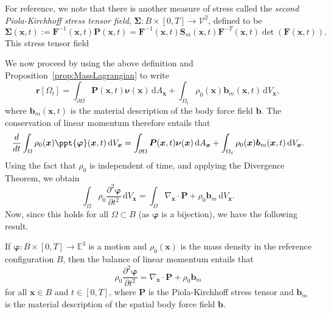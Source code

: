 \documentclass[
  letterpaper,
  DIV=11,
  numbers=noendperiod]{scrreprt}
\theoremstyle{plain}
\theoremstyle{remark}
\begin{document}
For reference, we note that there is another measure of stress called
the \emph{second Piola-Kirchhoff stress tensor field},
\({\boldsymbol{\Sigma}}:B\times[0,T]\to{\mathcal{V}}^2\), defined to be
\[{\boldsymbol{\Sigma}}({\boldsymbol{x}},t) := {\boldsymbol{F}}^{-1}({\boldsymbol{x}},t){\boldsymbol{P}}({\boldsymbol{x}},t) = {\boldsymbol{F}}^{-1}({\boldsymbol{x}},t){\boldsymbol{S}}_m({\boldsymbol{x}},t){\boldsymbol{F}}^{-T}({\boldsymbol{x}},t)\det({\boldsymbol{F}}({\boldsymbol{x}},t)).\]
This stress tensor field

We now proceed by using the above definition and
Proposition~\hyperref[prop:MassLagrangian]{{[}prop:MassLagrangian{]}} to
write \[{\boldsymbol{r}}[\Omega_t]
  = \int_{\partial \Omega} {\boldsymbol{P}}({\boldsymbol{x}},t){\boldsymbol{\nu}}({\boldsymbol{x}}){\,{\mathrm{d}}A_{{\boldsymbol{x}}}}+\int_{\Omega_t}\rho_0({\boldsymbol{x}}){\boldsymbol{b}}_m({\boldsymbol{x}},t){\,{\mathrm{d}}V_{{\boldsymbol{x}}}},\]
where \({\boldsymbol{b}}_m({\boldsymbol{x}},t)\) is the material
description of the body force field \({\boldsymbol{b}}\). The
conservation of linear momentum therefore entails that
\[\frac{d}{dt}\int_\Omega \rho_0({\boldsymbol{x}})\ppt{{\boldsymbol{\varphi}}}({\boldsymbol{x}},t){\,{\mathrm{d}}V_{{\boldsymbol{x}}}}
  = \int_{\partial \Omega} {\boldsymbol{P}}({\boldsymbol{x}},t){\boldsymbol{\nu}}({\boldsymbol{x}}){\,{\mathrm{d}}A_{{\boldsymbol{x}}}}+\int_{\Omega_t}\rho_0({\boldsymbol{x}}){\boldsymbol{b}}_m({\boldsymbol{x}},t){\,{\mathrm{d}}V_{{\boldsymbol{x}}}}.\]
Using the fact that \(\rho_0\) is independent of time, and applying the
Divergence Theorem, we obtain
\[\int_\Omega \rho_0\frac{\partial^2{\boldsymbol{\varphi}}}{\partial t^2}{\,{\mathrm{d}}V_{{\boldsymbol{x}}}}
  = \int_\Omega \nabla_{\boldsymbol{x}}\cdot {\boldsymbol{P}}+\rho_0{\boldsymbol{b}}_m{\,{\mathrm{d}}V_{{\boldsymbol{x}}}}.\]
Now, since this holds for all \(\Omega\subset B\) (as
\({\boldsymbol{\varphi}}\) is a bijection), we have the following
result.

If \({\boldsymbol{\varphi}}:B\times[0,T]\to{\mathbb{E}}^3\) is a motion
and \(\rho_0({\boldsymbol{x}})\) is the mass density in the reference
configuration \(B\), then the balance of linear momentum entails that
\[\rho_0\frac{\partial^2{\boldsymbol{\varphi}}}{\partial t^2} = \nabla_{\boldsymbol{x}}\cdot{\boldsymbol{P}}+\rho_0{\boldsymbol{b}}_m\]
for all \({\boldsymbol{x}}\in B\) and \(t\in[0,T]\), where
\({\boldsymbol{P}}\) is the Piola-Kirchhoff stress tensor and
\({\boldsymbol{b}}_m\) is the material description of the spatial body
force field \({\boldsymbol{b}}\).
\end{document}
